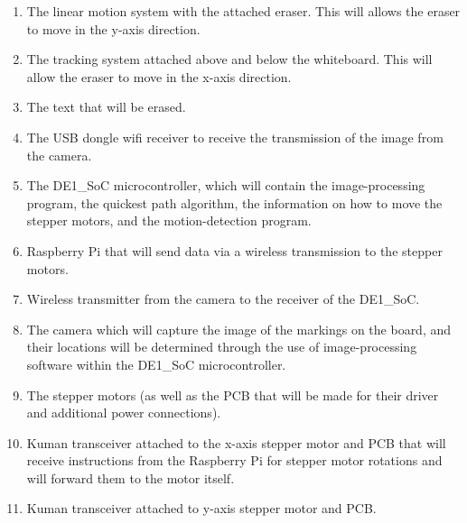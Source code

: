 \begin{enumerate}
	\item The linear motion system with the attached eraser. This will allows the eraser to move in the y-axis direction.
	\item The tracking system attached above and below the whiteboard. This will allow the eraser to move in the x-axis direction.
	\item The text that will be erased. 
	\item The USB dongle wifi receiver to receive the transmission of the image from the camera.
	\item The DE1\_SoC microcontroller, which will contain the image-processing program, the quickest path algorithm, the information on how to move the stepper motors, and the motion-detection program.
	\item Raspberry Pi that will send data via a wireless transmission to the stepper motors.
	\item Wireless transmitter from the camera to the receiver of the DE1\_SoC.
	\item The camera which will capture the image of the markings on the board, and their locations will be determined through the use of image-processing software within the DE1\_SoC microcontroller.
	\item The stepper motors (as well as the PCB that will be made for their driver and additional power connections). 
	\item Kuman transceiver attached to the x-axis stepper motor and PCB that will receive instructions from the Raspberry Pi for stepper motor rotations and will forward them to the motor itself.
	\item Kuman transceiver attached to y-axis stepper motor and PCB. \\
\end{enumerate} \par

